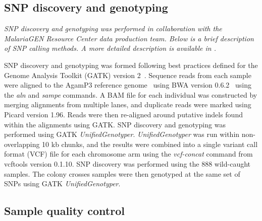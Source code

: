 \documentclass[a4paper,11pt,abstracton,hidelinks]{scrartcl}
\begin{document}
\subsection{SNP discovery and genotyping}\label{subsec:snp-discovery-and-genotyping}


\textit{SNP discovery and genotyping was performed in collaboration with the MalariaGEN Resource Center data production team. Below is a brief description of SNP calling methods. A more detailed description is available in \textcite{Ag1000G2017}.}


SNP discovery and genotyping was formed following best practices defined for the Genome Analysis Toolkit (GATK) version 2~\parencite{McKenna2010,Depristo2011,VanderAuwera2013}.
%
Sequence reads from each sample were aligned to the AgamP3 reference genome~\parencite{Holt2002,Sharakhova2007} using BWA version 0.6.2~\parencite{Li2009} using the \textit{aln} and \textit{sampe} commands.
%
A BAM file for each individual was constructed by merging alignments from multiple lanes, and duplicate reads were marked using Picard version 1.96.
%
Reads were then re-aligned around putative indels found within the alignments using GATK.
%
SNP discovery and genotyping was performed using GATK \textit{UnifiedGenotyper}.
%
\textit{UnifiedGenotyper} was run within non-overlapping 10 kb chunks, and the results were combined into a single variant call format (VCF) file for each chromosome arm using the \textit{vcf-concat} command from vcftools version 0.1.10.
%
SNP discovery was performed using the 888 wild-caught samples.
%
The colony crosses samples were then genotyped at the same set of SNPs using GATK \textit{UnifiedGenotyper}.


\subsection{Sample quality control}\label{subsec:sample-quality-control}
\end{document}
